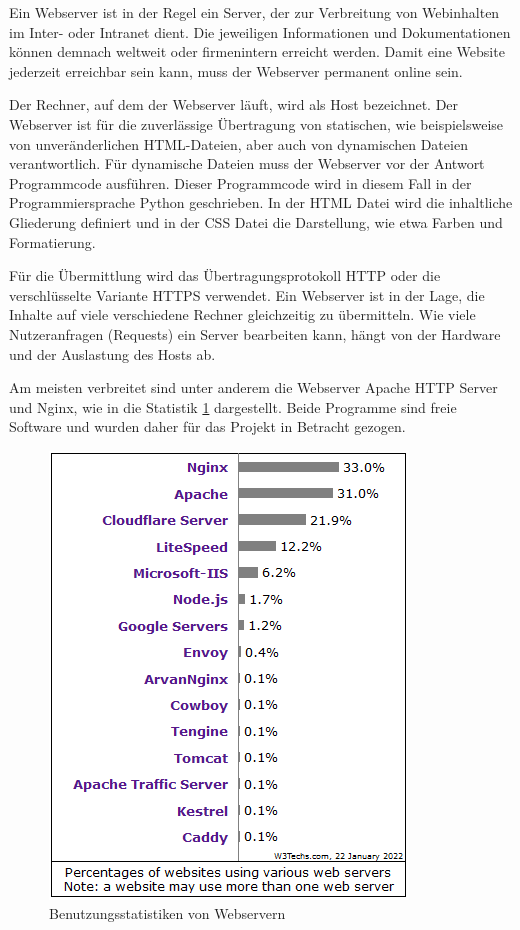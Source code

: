 Ein Webserver ist in der Regel ein Server, der zur Verbreitung von Webinhalten im Inter- oder Intranet dient. Die jeweiligen Informationen und Dokumentationen können demnach weltweit oder firmenintern erreicht werden. Damit eine Website jederzeit erreichbar sein kann, muss der Webserver permanent online sein.

Der Rechner, auf dem der Webserver läuft, wird als Host bezeichnet. Der Webserver ist für die zuverlässige Übertragung von statischen, wie beispielsweise von unveränderlichen \ac{HTML}-Dateien, aber auch von dynamischen Dateien verantwortlich. Für dynamische Dateien muss der Webserver vor der Antwort Programmcode ausführen. Dieser Programmcode wird in diesem Fall in der Programmiersprache Python geschrieben. In der \ac{HTML} Datei wird die inhaltliche Gliederung definiert und in der \ac{CSS} Datei die Darstellung, wie etwa Farben und Formatierung.

Für die Übermittlung wird das Übertragungsprotokoll \ac{HTTP} oder die verschlüsselte Variante \ac{HTTPS} verwendet.
Ein Webserver ist in der Lage, die Inhalte auf viele verschiedene Rechner gleichzeitig zu übermitteln. Wie viele Nutzeranfragen (Requests) ein Server bearbeiten kann, hängt von der Hardware und der Auslastung des Hosts ab. 

Am meisten verbreitet sind unter anderem die Webserver Apache HTTP Server und Nginx, wie in die Statistik \ref{fig:WebserverStatistik} dargestellt. Beide Programme sind freie Software und wurden daher für das Projekt in Betracht gezogen. \cite{karlstetter_2019} \cite{stackoverflow}

\begin{figure}[H]
	\centering
	\includegraphics{images/StatistikWebserver.png}
	\caption{Benutzungsstatistiken von Webservern \cite{w3techs}}
	\label{fig:WebserverStatistik}
\end{figure}


